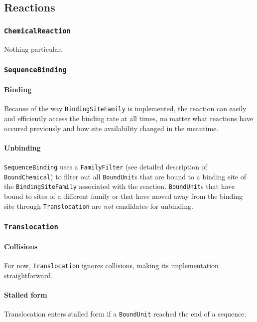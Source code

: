 
\subsection{Reactions}


\subsubsection{\texttt{ChemicalReaction}}

Nothing particular.


\subsubsection{\texttt{SequenceBinding}}

\paragraph{Binding}
Because of the way \texttt{BindingSiteFamily} is implemented,
the reaction can easily and efficiently access the binding rate at all times,
no matter what reactions have occured previously and how site availability changed in the meantime.

\paragraph{Unbinding}
\texttt{SequenceBinding} uses a \texttt{FamilyFilter}
(see detailed description of \texttt{BoundChemical})
to filter out all \texttt{BoundUnit}s that are bound to
a binding site of the \texttt{BindingSiteFamily} associated with the reaction.
\texttt{BoundUnit}s that have bound to sites of a different family
or that have moved away from the binding site
through \texttt{Translocation} are \emph{not} candidates for unbinding.


\subsubsection{\texttt{Translocation}}

\paragraph{Collisions}
For now, \texttt{Translocation} ignores collisions,
making its implementation straightforward.

\paragraph{Stalled form}
Translocation enters stalled form if a \texttt{BoundUnit} reached the end of a sequence.



